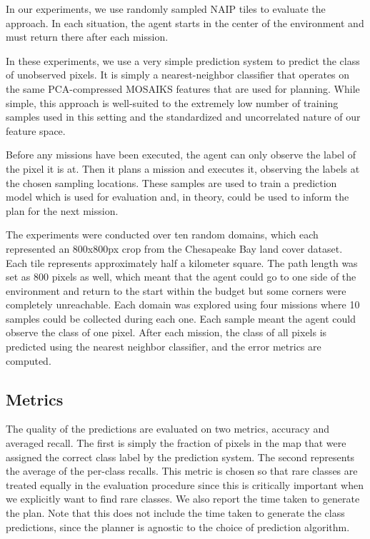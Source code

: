 In our experiments, we use randomly sampled NAIP tiles to evaluate the approach. In each situation, the agent starts in the center of the environment and must return there after each mission.

In these experiments, we use a very simple prediction system to predict the class of unobserved pixels. It is simply a nearest-neighbor classifier that operates on the same PCA-compressed MOSAIKS features that are used for planning. While simple, this approach is well-suited to the extremely low number of training samples used in this setting and the standardized and uncorrelated nature of our feature space.

Before any missions have been executed, the agent can only observe the label of the pixel it is at. Then it plans a mission and executes it, observing the labels at the chosen sampling locations. These samples are used to train a prediction model which is used for evaluation and, in theory, could be used to inform the plan for the next mission. 


The experiments were conducted over ten random domains, which each represented an 800x800px crop from the Chesapeake Bay land cover dataset. Each tile represents approximately half a kilometer square. The path length was set as 800 pixels as well, which meant that the agent could go to one side of the environment and return to the start within the budget but some corners were completely unreachable. Each domain was explored using four missions where 10 samples could be collected during each one. Each sample meant the agent could observe the class of one pixel. After each mission, the class of all pixels is predicted using the nearest neighbor classifier, and the error metrics are computed. 


\subsection{Metrics}
The quality of the predictions are evaluated on two metrics, accuracy and averaged recall. The first is simply the fraction of pixels in the map that were assigned the correct class label by the prediction system. The second represents the average of the per-class recalls. This metric is chosen so that rare classes are treated equally in the evaluation procedure since this is critically important when we explicitly want to find rare classes. We also report the time taken to generate the plan. Note that this does not include the time taken to generate the class predictions, since the planner is agnostic to the choice of prediction algorithm.

